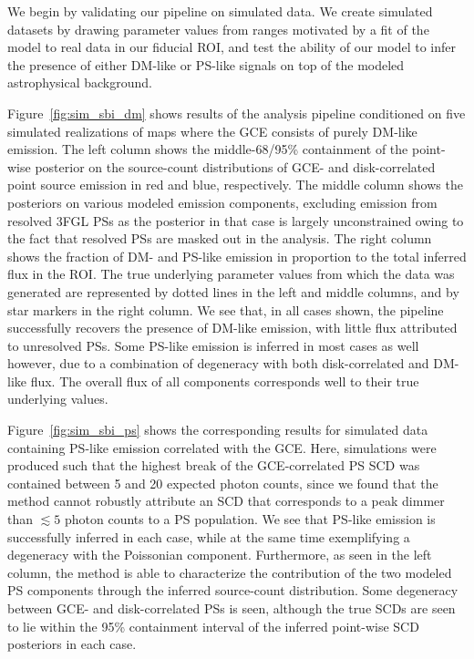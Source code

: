 \documentclass[prd,aps,10pt,nofootinbib,twocolumn,superscriptaddress,preprintnumbers,balancelastpage,longbibliography]{revtex4-1}
\begin{document}
We begin by validating our pipeline on simulated \Fermi data. We create simulated datasets by drawing parameter values from ranges motivated by a fit of the model to real \Fermi data in our fiducial ROI, and test the ability of our model to infer the presence of either DM-like or PS-like signals on top of the modeled astrophysical background.

Figure~\ref{fig:sim_sbi_dm} shows results of the analysis pipeline conditioned on five simulated realizations of maps where the GCE consists of purely DM-like emission. The left column shows the middle-68/95\% containment of the point-wise posterior on the source-count distributions of GCE- and disk-correlated point source emission in red and blue, respectively. The middle column shows the posteriors on various modeled emission components, excluding emission from resolved 3FGL PSs as the posterior in that case is largely unconstrained owing to the fact that resolved PSs are masked out in the analysis. The right column shows the fraction of DM- and PS-like emission in proportion to the total inferred flux in the ROI. The true underlying parameter values from which the data was generated are represented by dotted lines in the left and middle columns, and by star markers in the right column. We see that, in all cases shown, the pipeline successfully recovers the presence of DM-like emission, with little flux attributed to unresolved PSs. Some PS-like emission is inferred in most cases as well however, due to a combination of degeneracy with both disk-correlated and DM-like flux. The overall flux of all components corresponds well to their true underlying values.

Figure~\ref{fig:sim_sbi_ps} shows the corresponding results for simulated data containing PS-like emission correlated with the GCE. Here, simulations were produced such that the highest break of the GCE-correlated PS SCD was contained between 5 and 20 expected photon counts, since we found that the method cannot robustly attribute an SCD that corresponds to a peak dimmer than $\lesssim5$ photon counts to a PS population. We see that PS-like emission is successfully inferred in each case, while at the same time exemplifying a degeneracy with the Poissonian component. Furthermore, as seen in the left column, the method is able to characterize the contribution of the two modeled PS components through the inferred source-count distribution. Some degeneracy between GCE- and disk-correlated PSs is seen, although the true SCDs are seen to lie within the 95\% containment interval of the inferred point-wise SCD posteriors in each case.
\end{document}
